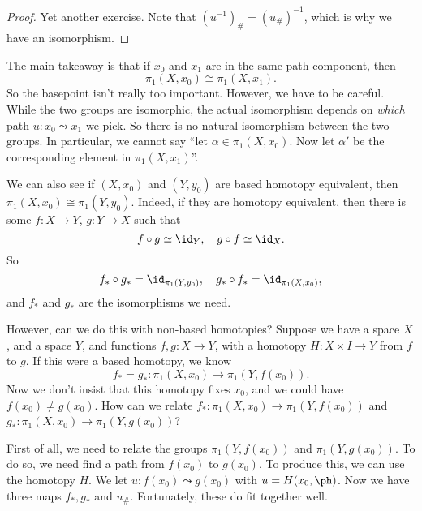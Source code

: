 \documentclass[a4paper]{article}
\begin{document}
\begin{proof}
  Yet another exercise. Note that $(u^{-1})_\# = (u_\#)^{-1}$, which is why we have an isomorphism. %
\end{proof}
The main takeaway is that if $x_0$ and $x_1$ are in the same path component, then
\[
  \pi_1(X, x_0) \cong \pi_1(X, x_1).
\]
So the basepoint isn't really too important. However, we have to be careful. While the two groups are isomorphic, the actual isomorphism depends on \emph{which} path $u: x_0 \leadsto x_1$ we pick. So there is no natural isomorphism between the two groups. In particular, we cannot say ``let $\alpha \in \pi_1(X, x_0)$. Now let $\alpha'$ be the corresponding element in $\pi_1(X, x_1)$''.

We can also see if $(X, x_0)$ and $(Y, y_0)$ are based homotopy equivalent, then $\pi_1(X, x_0)\cong \pi_1(Y, y_0)$. Indeed, if they are homotopy equivalent, then there is some $f: X \to Y$, $g: Y \to X$ such that
\[
  f\circ g \simeq \id_Y,\quad g\circ f \simeq \id_X.
\]
So
\[
  f_*\circ g_* = \id_{\pi_1(Y, y_0)},\quad g_*\circ f_* = \id_{\pi_1(X, x_0)},
\]
and $f_*$ and $g_*$ are the isomorphisms we need.

However, can we do this with non-based homotopies? Suppose we have a space $X$, and a space $Y$, and functions $f, g: X \to Y$, with a homotopy $H: X\times I \to Y$ from $f$ to $g$. If this were a based homotopy, we know
\[
  f_* = g_*: \pi_1(X, x_0) \to \pi_1(Y, f(x_0)).
\]
Now we don't insist that this homotopy fixes $x_0$, and we could have $f(x_0) \not= g(x_0)$. How can we relate $f_*: \pi_1(X, x_0) \to \pi_1(Y, f(x_0))$ and $g_*: \pi_1(X, x_0) \to \pi_1(Y, g(x_0))$?

First of all, we need to relate the groups $\pi_1(Y, f(x_0))$ and $\pi_1(Y, g(x_0))$. To do so, we need find a path from $f(x_0)$ to $g(x_0)$. To produce this, we can use the homotopy $H$. We let $u: f(x_0) \leadsto g(x_0)$ with $u = H(x_0, \ph)$. Now we have three maps $f_*, g_*$ and $u_\#$. Fortunately, these do fit together well.
\begin{center}
\end{center}
\end{document}
